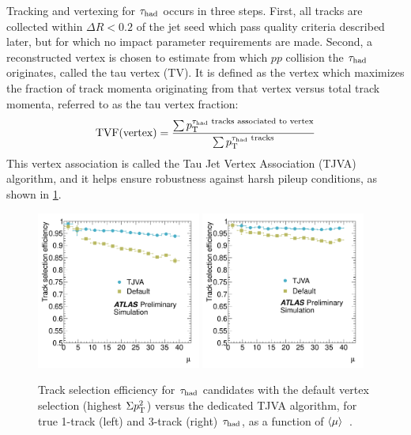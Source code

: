 Tracking and vertexing for $\tau_\text{had}$ occurs in three steps. First, all tracks are collected within $\Delta R < 0.2$ of the jet seed which pass quality criteria described later, but for which no impact parameter requirements are made. Second, a reconstructed vertex is chosen to estimate from which $pp$ collision the $\tau_\text{had}$ originates, called the tau vertex (TV). It is defined as the vertex which maximizes the fraction of track momenta originating from that vertex versus total track momenta, referred to as the tau vertex fraction:
%
\begin{equation}
  \begin{split}
    \text{TVF}(\text{vertex}) &= \frac{\sum \pt^\text{$\tauh$ tracks associated to vertex}}{\sum \pt^\text{$\tauh$ tracks}} \\
  \end{split}
  \label{eqn:taus-tvf}
\end{equation}
%
This vertex association is called the Tau Jet Vertex Association (TJVA) algorithm, and it helps ensure robustness against harsh pileup conditions, as shown in \cref{fig:taus-tjva}.

\begin{figure}[tp]
  \centering
  \includegraphics[width=0.48\textwidth]{figures/ATLAS-CONF-2012-142/fig_01a}
  \includegraphics[width=0.48\textwidth]{figures/ATLAS-CONF-2012-142/fig_01b}
  \caption{Track selection efficiency for $\tau_\text{had}$ candidates with the default vertex selection (highest $\Sigma p_{\mathrm{T}}^2$) versus the dedicated TJVA algorithm, for true 1-track (left) and 3-track (right) $\tau_\text{had}$, as a function of $\langle\mu\rangle$~\cite{ATLAS-CONF-2012-142}.}
  \label{fig:taus-tjva}
\end{figure}

